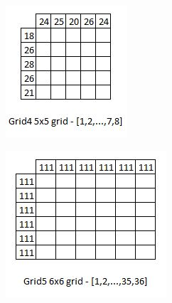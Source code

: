 \documentclass[journal, a4paper]{IEEEtran}
\begin{document}
\begin{figure}[h!]
    	 \begin{center}
		\includegraphics{grid4.jpg}
    	 \end{center}
\end{figure}

\begin{figure}[h!]
    	 \begin{center}
		\includegraphics{grid5.jpg}
    	 \end{center}
\end{figure}
\end{document}
